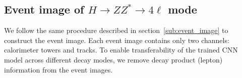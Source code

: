 \documentclass[12pt]{article}
\begin{document}
        \begin{table}[htpb]
            \centering
            \caption{The number of events of mixed datasets under different selection cuts. Here, $agbq$ means that $n_g=a, n_q=b$.}
            \label{tab:number_of_event_in_mixed_dataset_gluon_jet}
        \end{table}
    \subsection{Event image of \texorpdfstring{$H \to ZZ^* \to 4\ell$}{H to ZZ to 4l} mode}%
    \label{sub:event_image_of_h_to_zz_to_4l_mode}
        
        We follow the same procedure described in section~\ref{sub:event_image} to construct the event image. Each event image contains only two channels: calorimeter towers and tracks. To enable transferability of the trained CNN model across different decay modes, we remove decay product (lepton) information from the event images.
\end{document}
